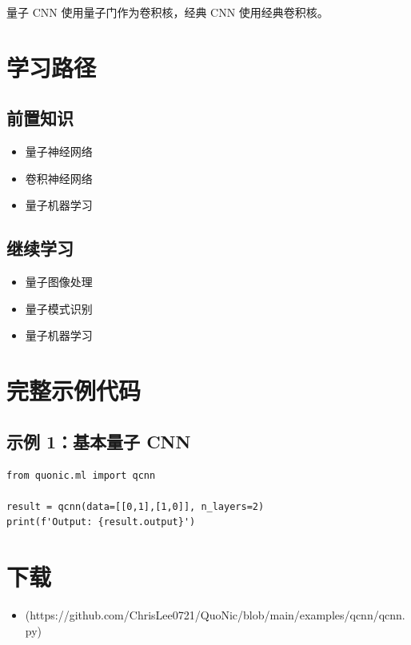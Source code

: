 \documentclass[12pt,a4paper]{article}
\begin{document}
量子 CNN 使用量子门作为卷积核，经典 CNN 使用经典卷积核。

\section{学习路径}

\subsection{前置知识}
\begin{itemize}
  \item 量子神经网络
  \item 卷积神经网络
  \item 量子机器学习
\end{itemize}

\subsection{继续学习}
\begin{itemize}
  \item 量子图像处理
  \item 量子模式识别
  \item 量子机器学习
\end{itemize}

\section{完整示例代码}

\subsection{示例 1：基本量子 CNN}

\begin{verbatim}
from quonic.ml import qcnn

result = qcnn(data=[[0,1],[1,0]], n_layers=2)
print(f'Output: {result.output}')
\end{verbatim}

\section{下载}

\begin{itemize}
  \item [qcnn.py](https://github.com/ChrisLee0721/QuoNic/blob/main/examples/qcnn/qcnn.py)
\end{itemize}
\end{document}
